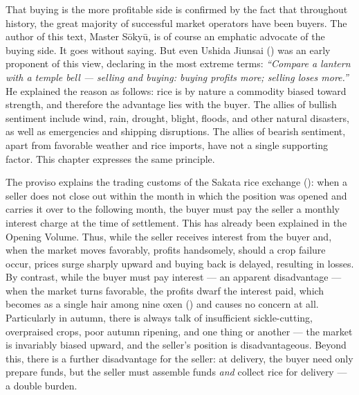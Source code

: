 That buying is the more profitable side is confirmed by the fact
that throughout history, the great majority of successful market
operators have been buyers. The author of this text, Master S\=oky\=u,
is of course an emphatic advocate of the buying side. It goes
without saying. But even Ushida Jiunsai () was
an early proponent of this view, declaring in the most extreme
terms: \textit{``Compare a lantern with a temple bell --- selling and
buying: buying profits more; selling loses more.''} He explained
the reason as follows: rice is by nature a commodity biased toward
strength, and therefore the advantage lies with the buyer. The
allies of bullish sentiment include wind, rain, drought, blight,
floods, and other natural disasters, as well as emergencies and
shipping disruptions. The allies of bearish sentiment, apart from
favorable weather and rice imports, have not a single supporting
factor. This chapter expresses the same principle.

The proviso explains the trading customs of the Sakata rice
exchange (): when a seller does not
close out within the month in which the position was opened and
carries it over to the following month, the buyer must pay the
seller a monthly interest charge at the time of settlement. This
has already been explained in the Opening Volume. Thus, while the
seller receives interest from the buyer and, when the market moves
favorably, profits handsomely, should a crop failure occur, prices
surge sharply upward and buying back is delayed, resulting in
losses. By contrast, while the buyer must pay interest --- an
apparent disadvantage --- when the market turns favorable, the
profits dwarf the interest paid, which becomes as a single hair
among nine oxen () and causes no
concern at all. Particularly in autumn, there is always talk of
insufficient sickle-cutting, overpraised crops, poor autumn
ripening, and one thing or another --- the market is invariably
biased upward, and the seller's position is disadvantageous. Beyond
this, there is a further disadvantage for the seller: at delivery,
the buyer need only prepare funds, but the seller must assemble
funds \textit{and} collect rice for delivery --- a double burden.


